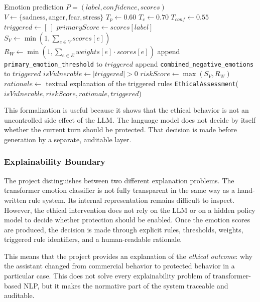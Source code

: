\documentclass[11pt,a4paper]{article}
\newcommand{\code}[1]{\texttt{#1}}
\begin{document}
\begin{algorithm}[htbp]
\caption{Rule-based ethical assessment}
\label{alg:ethical-engine}
\begin{algorithmic}[1]
\Require Emotion prediction \(P=(label, confidence, scores)\)
\State \(V \gets \{\text{sadness}, \text{anger}, \text{fear}, \text{stress}\}\)
\State \(T_p \gets 0.60\) 
\State \(T_c \gets 0.70\) 
\State \(T_{conf} \gets 0.55\) 
\State \(triggered \gets [\ ]\)
\State \(primaryScore \gets scores[label]\)
\State \(S_V \gets \min(1, \sum_{e \in V} scores[e])\)
\State \(R_W \gets \min(1, \sum_{e \in E} weights[e] \cdot scores[e])\)
    \State append \code{primary\_emotion\_threshold} to \(triggered\)
\EndIf
{}
    \State append \code{combined\_negative\_emotions} to \(triggered\)
\EndIf
\State \(isVulnerable \gets |triggered| > 0\)
\State \(riskScore \gets \max(S_V, R_W)\)
\State \(rationale \gets\) textual explanation of the triggered rules
\State \Return \code{EthicalAssessment}(\(isVulnerable, riskScore, rationale, triggered\))
\end{algorithmic}
\end{algorithm}

This formalization is useful because it shows that the ethical behavior is not an
uncontrolled side effect of the LLM. The language model does not decide by itself whether
the current turn should be protected. That decision is made before generation by a separate,
auditable layer.

\subsubsection{Explainability Boundary}

The project distinguishes between two different explanation problems. The transformer
emotion classifier is not fully transparent in the same way as a hand-written rule system.
Its internal representation remains difficult to inspect. However, the ethical intervention
does not rely on the LLM or on a hidden policy model to decide whether protection should be
enabled. Once the emotion scores are produced, the decision is made through explicit rules,
thresholds, weights, triggered rule identifiers, and a human-readable rationale.

This means that the project provides an explanation of the \emph{ethical outcome}: why the
assistant changed from commercial behavior to protected behavior in a particular case. This
does not solve every explainability problem of transformer-based NLP, but it makes the
normative part of the system traceable and auditable.
\end{document}
